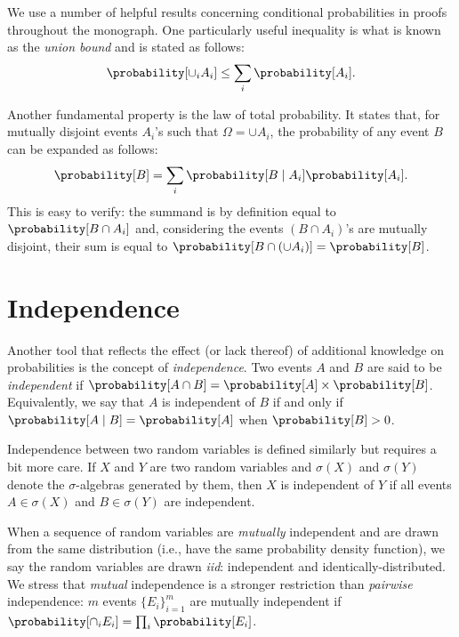 We use a number of helpful results concerning conditional probabilities
in proofs throughout the monograph. One particularly useful inequality
is what is known as the \emph{union bound} and is stated as follows:
\begin{equation*}
    \probability[\cup_i A_i] \leq \sum_i \probability[A_i].
\end{equation*}

Another fundamental property is the law of total probability.
It states that, for mutually disjoint events $A_i$'s such that
$\Omega = \cup A_i$, the probability of any event $B$ can be expanded
as follows:
\begin{equation*}
    \probability[B] = \sum_i \probability[B \;\lvert\; A_i] \probability[A_i].
\end{equation*}
This is easy to verify: the summand is by definition equal to $\probability[B \cap A_i]$
and, considering the events $(B \cap A_i)$'s are mutually disjoint, their sum
is equal to $\probability[B \cap (\cup A_i)] = \probability[B]$.


\section{Independence}
Another tool that reflects the effect (or lack thereof) of additional knowledge on probabilities
is the concept of \emph{independence}. Two events $A$ and $B$ are said to be
\emph{independent} if $\probability[A \cap B] = \probability[A] \times \probability[B]$.
Equivalently, we say that $A$ is independent of $B$ if and only if
$\probability[A \;\lvert\; B] = \probability[A]$ when $\probability[B] > 0$.

\bigskip

Independence between two random variables is defined similarly but requires a bit more care.
If $X$ and $Y$ are two random variables and $\sigma(X)$ and $\sigma(Y)$ denote
the $\sigma$-algebras generated by them, then $X$ is independent of $Y$ if
all events $A \in \sigma(X)$ and $B \in \sigma(Y)$ are independent.

When a sequence of random variables are \emph{mutually} independent and are drawn
from the same distribution (i.e., have the same probability density function),
we say the random variables are drawn \emph{iid}: independent and identically-distributed.
We stress that \emph{mutual} independence is a stronger restriction than
\emph{pairwise} independence: $m$ events $\{ E_i \}_{i=1}^m$ are mutually independent if
$\probability[\cap_i E_i] = \prod_i \probability[E_i]$.

